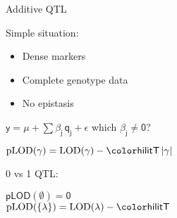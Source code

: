 \documentclass[aspectratio=169,12pt,t]{beamer}
\newcommand{\lod}{\text{LOD}}
\newcommand{\plod}{\text{pLOD}}
\begin{document}
\begin{frame}{Additive QTL}


\hfill \begin{minipage}{10in}

Simple situation:

\lolit
\begin{itemize}
\item Dense markers
\item Complete genotype data
\item No epistasis

\end{itemize}

\vspace{2cm}

\centerline{
$\mathsf{y  = \mu + \sum \beta_j \, q_j + \epsilon}$ \hspace{1cm}
       {\hilit which $\mathsf{\beta_j \ne 0}$?}
}

\vspace{2cm}

{\color{myyellow}
$\mathsf{ \plod(\gamma) = \lod(\gamma) -
    {\hilit T} \, |\gamma| }$
}

\vspace{2cm}

\begin{minipage}[t]{1.4in}
\vspace*{0mm}

0 vs 1 QTL:
\end{minipage}
\begin{minipage}[t]{6in}
\vspace*{0mm}

\lolit
$\mathsf{\plod(\emptyset) = 0}$ \\[16pt]
$\mathsf{\plod(\{\lambda\}) =
    \lod(\lambda) - {\hilit T}}$
\end{minipage}


\end{minipage}



\end{frame}







\addtocounter{page}{-1}
\end{document}
